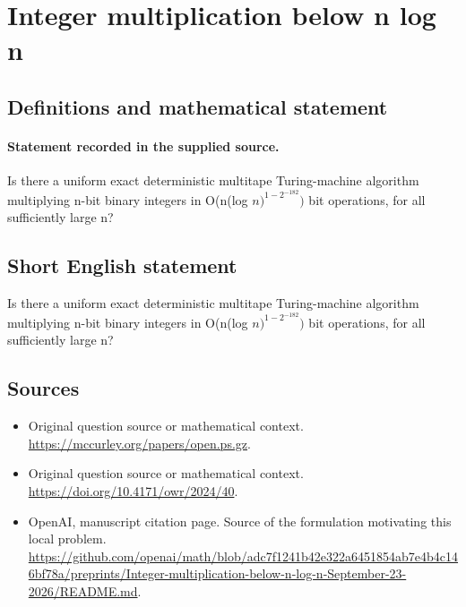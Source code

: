 \documentclass[11pt]{article}
\begin{document}
\section*{Integer multiplication below n log n}\label{30007461}
\subsection{Definitions and mathematical statement}
\paragraph{Statement recorded in the supplied source.}
Is there a uniform exact deterministic multitape Turing-machine algorithm multiplying n-bit binary integers in O(n(log $n)^{1-2^{-182}})$ bit operations, for all sufficiently large n?
\subsection{Short English statement}
Is there a uniform exact deterministic multitape Turing-machine algorithm multiplying n-bit binary integers in O(n(log $n)^{1-2^{-182}})$ bit operations, for all sufficiently large n?
\subsection{Sources}
\begin{itemize}
\item[S1] Original question source or mathematical context.
\url{https://mccurley.org/papers/open.ps.gz}.
\item[S2] Original question source or mathematical context.
\url{https://doi.org/10.4171/owr/2024/40}.
\item[S3] OpenAI, manuscript citation page. Source of the formulation motivating this local problem.
\url{https://github.com/openai/math/blob/adc7f1241b42e322a6451854ab7e4b4c146bf78a/preprints/Integer-multiplication-below-n-log-n-September-23-2026/README.md}.
\end{itemize}
\end{document}
